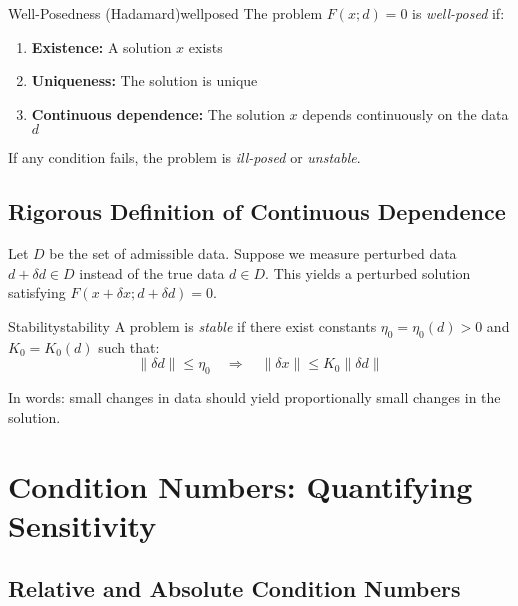 \begin{definition}{Well-Posedness (Hadamard)}{wellposed}
    The problem $F(x; d) = 0$ is \emph{well-posed} if:
    \begin{enumerate}
        \item \textbf{Existence:} A solution $x$ exists
        \item \textbf{Uniqueness:} The solution is unique
        \item \textbf{Continuous dependence:} The solution $x$ depends continuously on the data $d$
    \end{enumerate}
    If any condition fails, the problem is \emph{ill-posed} or \emph{unstable}.
\end{definition}

\subsection{Rigorous Definition of Continuous Dependence}
\label{subsec:continuous-dependence}

Let $D$ be the set of admissible data. Suppose we measure perturbed data $d + \delta d \in D$ instead of the true data $d \in D$. This yields a perturbed solution satisfying $F(x + \delta x; d + \delta d) = 0$.

\begin{definition}{Stability}{stability}
    A problem is \emph{stable} if there exist constants $\eta_0 = \eta_0(d) > 0$ and $K_0 = K_0(d)$ such that:
    \[
        \|\delta d\| \leq \eta_0 \quad \Rightarrow \quad \|\delta x\| \leq K_0 \|\delta d\|
    \]
\end{definition}

In words: small changes in data should yield proportionally small changes in the solution.

\section{Condition Numbers: Quantifying Sensitivity}
\label{sec:condition-numbers}

\subsection{Relative and Absolute Condition Numbers}
\label{subsec:condition-def}

